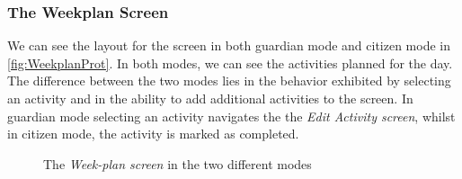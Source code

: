 \subsubsection{The Weekplan Screen}

We can see the layout for the screen in both \gls{guardian} mode and \gls{citizen} mode in \autoref{fig:WeekplanProt}. In both modes, we can see the activities planned for the day. The difference between the two modes lies in the behavior exhibited by selecting an activity and in the ability to add additional activities to the screen. In \gls{guardian} mode selecting an activity navigates the the \textit{Edit Activity screen}, whilst in \gls{citizen} mode, the activity is marked as completed.

\begin{figure}%
    \centering
    \quad
    \caption{The \textit{Week-plan screen} in the two different modes}%
    \label{fig:WeekplanProt}%
\end{figure}


